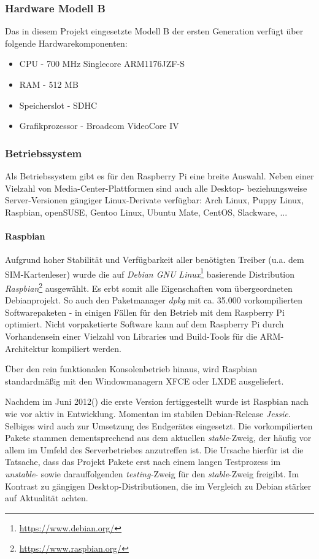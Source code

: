 \subsubsection{Hardware Modell B}
Das in diesem Projekt eingesetzte Modell B der ersten Generation verfügt über folgende Hardwarekomponenten:
\begin{itemize}
\item CPU - 700 MHz Singlecore ARM1176JZF-S
\item RAM - 512 MB
\item Speicherslot - SDHC
\item Grafikprozessor - Broadcom VideoCore IV
\end{itemize}

\subsubsection{Betriebssystem}
Als Betriebssystem gibt es für den Raspberry Pi eine breite Auswahl.
Neben einer Vielzahl von Media-Center-Plattformen sind auch alle
Desktop- beziehungsweise Server-Versionen gängiger Linux-Derivate verfügbar:
Arch Linux, Puppy Linux, Raspbian, openSUSE, Gentoo Linux, Ubuntu Mate,
CentOS, Slackware, ...

\paragraph{Raspbian}
Aufgrund hoher Stabilität und Verfügbarkeit aller benötigten Treiber
(u.a. dem SIM-Kartenleser) wurde die auf \textit{Debian GNU Linux}\footnote{\url{https://www.debian.org/}}
basierende Distribution \textit{Raspbian}\footnote{\url{https://www.raspbian.org/}} ausgewählt.
Es erbt somit alle Eigenschaften vom übergeordneten Debianprojekt.
So auch den Paketmanager \textit{dpkg} mit ca. 35.000 vorkompilierten
Softwarepaketen - in einigen Fällen für den Betrieb mit dem
Raspberry Pi optimiert. Nicht vorpaketierte Software kann auf dem Raspberry
Pi durch Vorhandensein einer Vielzahl von Libraries und Build-Tools
für die ARM-Architektur kompiliert werden.

Über den rein funktionalen Konsolenbetrieb hinaus, wird Raspbian standardmäßig mit den
Windowmanagern XFCE oder LXDE ausgeliefert.

Nachdem im Juni 2012(\cite{raspbianweb}) die erste
Version fertiggestellt wurde ist Raspbian nach wie vor aktiv
in Entwicklung. Momentan im stabilen Debian-Release \textit{Jessie}.
Selbiges wird auch zur Umsetzung des Endgerätes eingesetzt.
Die vorkompilierten Pakete stammen dementsprechend aus dem aktuellen
\textit{stable}-Zweig, der häufig vor allem im Umfeld des Serverbetriebes
anzutreffen ist. Die Ursache hierfür ist die Tatsache, dass das
Projekt Pakete erst nach einem langen Testprozess im \textit{unstable}-
sowie darauffolgenden \textit{testing-}Zweig für den \textit{stable}-Zweig
freigibt. Im Kontrast zu gängigen Desktop-Distributionen, die
im Vergleich zu Debian stärker auf Aktualität achten.

